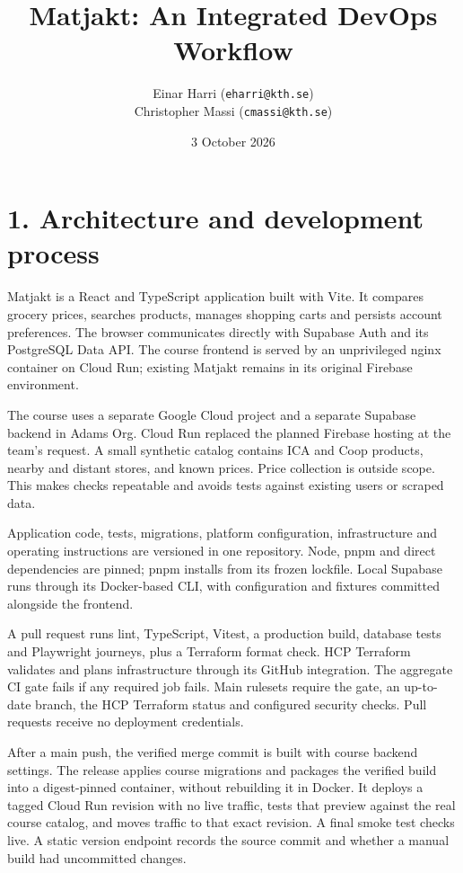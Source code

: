 \documentclass[10pt,a4paper]{article}
\title{Matjakt: An Integrated DevOps Workflow}
\author{Einar Harri (\texttt{eharri@kth.se})\\Christopher Massi (\texttt{cmassi@kth.se})}
\date{3 October 2026}
\begin{document}
\maketitle
\section*{1. Architecture and development process}
Matjakt is a React and TypeScript application built with Vite. It compares grocery prices, searches products, manages shopping carts and persists account preferences. The browser communicates directly with Supabase Auth and its PostgreSQL Data API. The course frontend is served by an unprivileged nginx container on Cloud Run; existing Matjakt remains in its original Firebase environment.

The course uses a separate Google Cloud project and a separate Supabase backend in Adams Org. Cloud Run replaced the planned Firebase hosting at the team's request. A small synthetic catalog contains ICA and Coop products, nearby and distant stores, and known prices. Price collection is outside scope. This makes checks repeatable and avoids tests against existing users or scraped data.

Application code, tests, migrations, platform configuration, infrastructure and operating instructions are versioned in one repository. Node, pnpm and direct dependencies are pinned; pnpm installs from its frozen lockfile. Local Supabase runs through its Docker-based CLI, with configuration and fixtures committed alongside the frontend.

A pull request runs lint, TypeScript, Vitest, a production build, database tests and Playwright journeys, plus a Terraform format check. HCP Terraform validates and plans infrastructure through its GitHub integration. The aggregate CI gate fails if any required job fails. Main rulesets require the gate, an up-to-date branch, the HCP Terraform status and configured security checks. Pull requests receive no deployment credentials.

After a main push, the verified merge commit is built with course backend settings. The release applies course migrations and packages the verified build into a digest-pinned container, without rebuilding it in Docker. It deploys a tagged Cloud Run revision with no live traffic, tests that preview against the real course catalog, and moves traffic to that exact revision. A final smoke test checks live. A static version endpoint records the source commit and whether a manual build had uncommitted changes.
\end{document}
